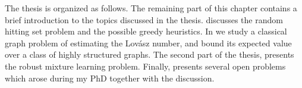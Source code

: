 
The thesis is organized as follows. 
The remaining part of this chapter contains a brief introduction to the topics discussed in the thesis.
 discusses the random hitting set problem and the possible greedy heuristics.
In  we study a classical graph problem of estimating the Lovász number, and bound its expected value over a class of highly structured graphs.
The second part of the thesis,  presents the robust mixture learning problem.
Finally,  presents several open problems which arose during my PhD together with the discussion.





